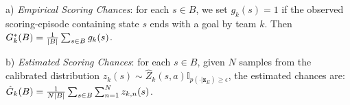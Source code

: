 \documentclass{article}
\newcommand{\condition}{\boldsymbol{z}_{E}}
\newcommand{\state}{s}
\newcommand{\action}{a}
\newcommand{\agentIndex}{k}
\newcommand{\bin}{B}
\newcommand{\goal}{g}
\begin{document}
a){ \it Empirical Scoring Chances}: for each $\state\in\bin$, we set $\goal_{\agentIndex}{(\state)} = 1$ if the observed scoring-episode containing state $\state$ ends with a goal by team $\agentIndex$. Then $\MakeUppercase{\goal}^{*}_{\agentIndex}(\bin) = \frac{1}{|\bin|}\sum_{\state \in \bin} \goal_{\agentIndex}(\state)$.

b){ \it Estimated Scoring Chances}: for each $\state\in\bin$, given $N$ samples from the calibrated distribution $z_{\agentIndex}(\state)\sim\hat{Z}_{\agentIndex}(\state,\action)\mathbb{I}_{p(\cdot|\condition)\geq\epsilon}$, the estimated chances are: $\hat{\MakeUppercase{\goal}}_{\agentIndex}(\bin) = \frac{1}{N|\bin|}\sum_{\state \in \bin} \sum_{n=1}^{N}z_{\agentIndex,n}(\state)$.
\end{document}
